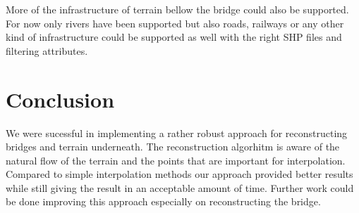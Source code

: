 \documentclass{egpubl-eurovis-star}
\begin{document}
More of the infrastructure of terrain bellow the bridge could also be supported.
For now only rivers have been supported but also roads, railways or any other kind of infrastructure could be supported as well with the right SHP files and filtering attributes.

\section{Conclusion}

We were sucessful in implementing a rather robust approach for reconstructing bridges and terrain underneath.
The reconstruction algorhitm is aware of the natural flow of the terrain and the points that are important for interpolation.
Compared to simple interpolation methods our approach provided better results while still giving the result in an acceptable amount of time.
Further work could be done improving this approach especially on reconstructing the bridge.

%



\end{document}
